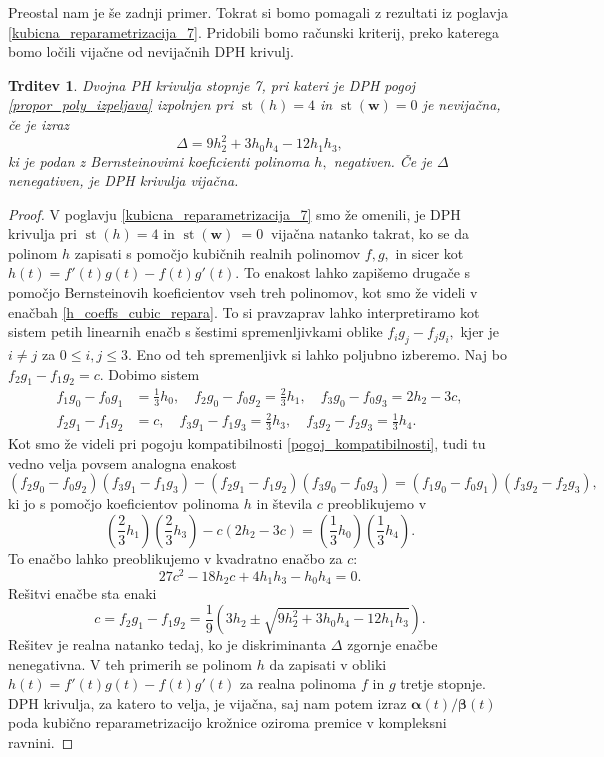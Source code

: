 \documentclass[12pt,a4paper,twoside]{article}
\theoremstyle{definition} %
\theoremstyle{plain} %
\newtheorem{trditev}[definicija]{Trditev}
\theoremstyle{primerstyle}
\numberwithin{equation}{section}  %
\newcommand{\wV}{\mathbf{w}}
\newcommand{\balpha}{\boldsymbol \alpha}
\newcommand{\bbeta}{\boldsymbol \beta}
\DeclareMathOperator{\st}{st}
\begin{document}
Preostal nam je še zadnji primer. Tokrat si bomo pomagali z rezultati iz poglavja \ref{kubicna_reparametrizacija_7}. Pridobili bomo računski kriterij, preko katerega bomo ločili vijačne od nevijačnih DPH krivulj.
\begin{trditev}
	\label{trditev_locevanje_h4w0}
	Dvojna PH krivulja stopnje 7, pri kateri je DPH pogoj \eqref{propor_poly_izpeljava} izpolnjen pri $\st(h)=4$ in $\st(\wV)=0$ je nevijačna, če je izraz
	\begin{equation}
		\label{diskriminanta}
		\Delta=9h_2^2+3h_0h_4-12h_1h_3,
	\end{equation}
	ki je podan z Bernsteinovimi koeficienti polinoma $h,$ negativen. Če je $\Delta$ nenegativen, je DPH krivulja vijačna.
\end{trditev}
\begin{proof}
	V poglavju \ref{kubicna_reparametrizacija_7} smo že omenili, je DPH krivulja pri $\st(h)=4$ in $\st(\wV)~=0~$ vijačna natanko takrat, ko se da polinom $h$ zapisati s pomočjo kubičnih realnih polinomov $f,g,$ in sicer kot $h(t)=f'(t)g(t)-f(t)g'(t).$ To enakost lahko zapišemo drugače s pomočjo Bernsteinovih koeficientov vseh treh polinomov, kot smo že videli v enačbah \eqref{h_coeffs_cubic_repara}. To si pravzaprav lahko interpretiramo kot sistem petih linearnih enačb s šestimi spremenljivkami oblike $f_ig_j-f_jg_i,$ kjer je $i\neq j$ za $0\leq i,j\leq 3.$ Eno od teh spremenljivk si lahko poljubno izberemo. Naj bo $f_2g_1-f_1g_2=c.$ Dobimo sistem
	\begin{align*}
		f_1g_0-f_0g_1&=\frac{1}{3}h_0,\quad f_2g_0-f_0g_2=\frac{2}{3}h_1,\quad f_3g_0-f_0g_3=2h_2-3c,\\
		f_2g_1-f_1g_2&=c,\quad f_3g_1-f_1g_3=\frac{2}{3}h_3,\quad f_3g_2-f_2g_3=\frac{1}{3}h_4.
	\end{align*}
	Kot smo že videli pri pogoju kompatibilnosti \eqref{pogoj_kompatibilnosti}, tudi tu vedno velja povsem analogna enakost
	\begin{equation*}
		(f_2g_0-f_0g_2)(f_3g_1-f_1g_3)-(f_2g_1-f_1g_2)(f_3g_0-f_0g_3)=(f_1g_0-f_0g_1)(f_3g_2-f_2g_3),
	\end{equation*}
	ki jo s pomočjo koeficientov polinoma $h$ in števila $c$ preoblikujemo v
	\begin{equation*}
		\left(\frac{2}{3}h_1\right)\left(\frac{2}{3}h_3\right)-c(2h_2-3c)=\left(\frac{1}{3}h_0\right)\left(\frac{1}{3}h_4\right).
	\end{equation*}
	To enačbo lahko preoblikujemo v kvadratno enačbo za $c$:
	\begin{equation*}
		27c^2-18h_2c+4h_1h_3-h_0h_4=0.
	\end{equation*}
	Rešitvi enačbe sta enaki
	\begin{equation*}
		c=f_2g_1-f_1g_2=\frac{1}{9}\left(3h_2\pm\sqrt{9h_2^2+3h_0h_4-12h_1h_3}\right).
	\end{equation*}
	Rešitev je realna natanko tedaj, ko je diskriminanta $\Delta$ zgornje enačbe nenegativna. V teh primerih se polinom $h$ da zapisati v obliki $h(t)=f'(t)g(t)-f(t)g'(t)$ za realna polinoma $f$ in $g$ tretje stopnje. DPH krivulja, za katero to velja, je vijačna, saj nam potem izraz $\balpha(t)/\bbeta(t)$ poda kubično reparametrizacijo krožnice oziroma premice v kompleksni ravnini.
	

\end{proof}
\end{document}

